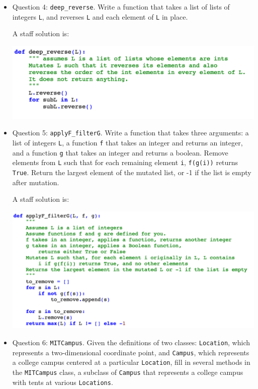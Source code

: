 \begin{itemize}
\item Question 4: \texttt{deep\_reverse}. Write a function that takes a list of lists of integers \texttt{L}, and reverses \texttt{L} and each element of \texttt{L} in place. 

A staff solution is:

\includegraphics[scale=0.65]{Body/figures/grovercode/fig_deep_reverse}

\item Question 5: \texttt{applyF\_filterG}. Write a function that takes three arguments: a list of integers \texttt{L}, a function \texttt{f} that takes an integer and returns an integer, and a function \texttt{g} that takes an integer and returns a boolean. Remove elements from \texttt{L} such that for each remaining element \texttt{i}, \texttt{f(g(i))} returns \texttt{True}. Return the largest element of the mutated list, or -1 if the list is empty after mutation. 

A staff solution is:

\includegraphics[scale=0.65]{Body/figures/grovercode/fig_applyF_filterG}

\item Question 6: \texttt{MITCampus}. Given the definitions of two classes: \texttt{Location}, which represents a two-dimensional coordinate point, and \texttt{Campus}, which represents a college campus centered at a particular \texttt{Location}, fill in several methods in the \texttt{MITCampus} class, a subclass of \texttt{Campus} that represents a college campus with tents at various \texttt{Locations}. 


\end{itemize}
